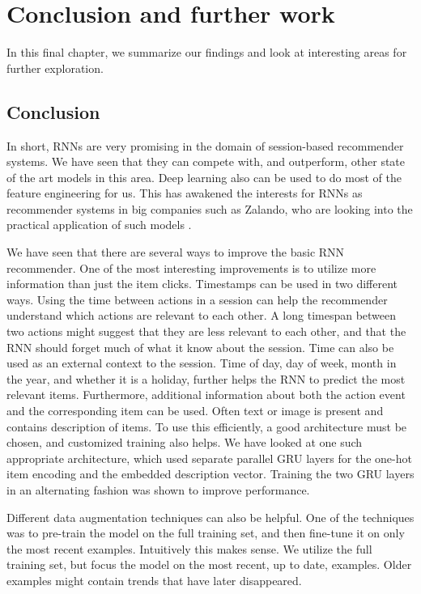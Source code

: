 \chapter{Conclusion and further work}
In this final chapter, we summarize our findings and look at interesting areas for further exploration.

\section{Conclusion}
In short, RNNs are very promising in the domain of session-based recommender systems. We have seen that they can compete with, and outperform, other state of the art models in this area. Deep learning also can be used to do most of the feature engineering for us. This has awakened the interests for RNNs as recommender systems in big companies such as Zalando, who are looking into the practical application of such models \cite{ZALANDO:understanding-consumer-histories}. 

We have seen that there are several ways to improve the basic RNN recommender. One of the most interesting improvements is to utilize more information than just the item clicks. Timestamps can be used in two different ways. Using the time between actions in a session can help the recommender understand which actions are relevant to each other. A long timespan between two actions might suggest that they are less relevant to each other, and that the RNN should forget much of what it know about the session. Time can also be used as an external context to the session. Time of day, day of week, month in the year, and whether it is a holiday, further helps the RNN to predict the most relevant items. Furthermore, additional information about both the action event and the corresponding item can be used. Often text or image is present and contains description of items. To use this efficiently, a good architecture must be chosen, and customized training also helps. We have looked at one such appropriate architecture, which used separate parallel GRU layers for the one-hot item encoding and the embedded description vector. Training the two GRU layers in an alternating fashion was shown to improve performance.

Different data augmentation techniques can also be helpful. One of the techniques was to pre-train the model on the full training set, and then fine-tune it on only the most recent examples. Intuitively this makes sense. We utilize the full training set, but focus the model on the most recent, up to date, examples. Older examples might contain trends that have later disappeared. 

